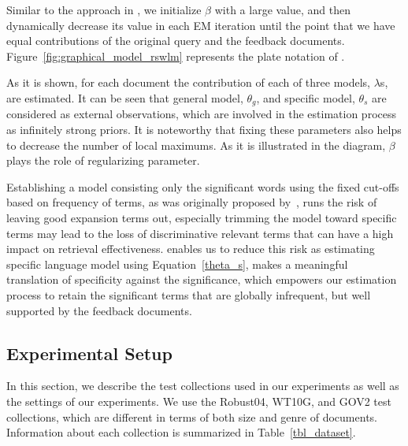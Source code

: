 Similar to the approach in \citep{Tao:2006}, we initialize $\beta$ with a large value, and then dynamically decrease its value in each EM iteration until the point that we have equal contributions of the original query and the feedback documents. 
Figure~\ref{fig:graphical_model_rswlm} represents the plate notation of \rswlms. 

As it is shown, for each document the contribution of each of three models, $\lambda$s, are estimated. It can be seen that general model, $\theta_g$, and specific model, $\theta_s$ are considered as external observations, which are involved in the estimation process as infinitely strong priors. It is noteworthy that fixing these parameters also helps to decrease the number of local maximums. As it is illustrated in the diagram, $\beta$ plays the role of regularizing parameter. 

Establishing a model consisting only the significant words using the fixed cut-offs based on frequency of terms, as was originally proposed by~\citet{Luhn:1958}, runs the risk of leaving good expansion terms out, especially trimming the model toward specific terms may lead to the loss of discriminative relevant terms that can have a high impact on retrieval effectiveness. \acswlm enables us to reduce this risk as estimating specific language model using Equation~\ref{theta_s}, makes a meaningful translation of specificity against the significance, which empowers our estimation process to retain the significant terms that are globally infrequent, but well supported by the feedback documents.

\subsection{Experimental Setup}
\label{sec:dataset}

In this section, we describe the test collections used in our experiments as well as the settings of our experiments. 
We use the Robust04, WT10G, and GOV2 test collections, which are different in terms of both size and genre of documents. 
Information about each collection is summarized in Table~\ref{tbl_dataset}.

